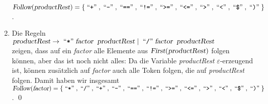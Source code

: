 \begin{enumerate}
      \hspace*{1.3cm}
      $\textsl{Follow}(\textsl{productRest}) = 
      \{ \quoted{+}, \quoted{-}, \quoted{==}, \quoted{!=}, \quoted{>=}, \quoted{<=}, \quoted{>}, \quoted{<}, \quoted{\symbol{36}}, \quoted{)} \}$.
\item Die Regeln 
      \\[0.2cm]
      \hspace*{1.3cm}
      $\textsl{productRest} \rightarrow \;\mbox{``\texttt{*}''}\; \textsl{factor}\;\;\textsl{productRest} 
                            \mid        \;\mbox{``\texttt{/}''}\; \textsl{factor}\;\;\textsl{productRest}$ 
      \\[0.2cm]
      zeigen, dass auf ein \textsl{factor} alle Elemente aus $\textsl{First}(\textsl{productRest})$
      folgen k\"onnen, aber das ist noch nicht alles:  Da die Variable \textsl{productRest}
      $\varepsilon$-erzeugend ist, k\"onnen zus\"atzlich auf \textsl{factor} auch
      alle Token folgen, die auf \textsl{productRest} folgen.  Damit haben wir insgesamt
      \\[0.2cm]
      \hspace*{1.3cm}
      $\textsl{Follow}(\textsl{factor}) = 
      \{ \quoted{*}, \quoted{/}, \quoted{+}, \quoted{-}, \quoted{==}, \quoted{!=}, \quoted{>=}, \quoted{<=}, \quoted{>}, \quoted{<}, \quoted{\symbol{36}}, \quoted{)} \}$.
      \qed
\end{enumerate}

